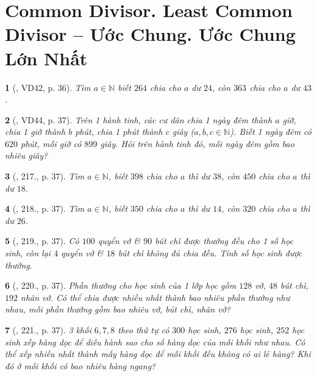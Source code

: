 \documentclass{article}
\newtheorem{baitoan}{}
\begin{document}

\section{Common Divisor. Least Common Divisor -- Ước Chung. Ước Chung Lớn Nhất}

\begin{baitoan}[\cite{Binh_Toan_6_tap_1}, VD42, p. 36]
	Tìm $a\in\mathbb{N}$ biết $264$ chia cho $a$ dư $24$, còn $363$ chia cho $a$ dư $43$.
\end{baitoan}

\begin{baitoan}[\cite{Binh_Toan_6_tap_1}, VD44, p. 37]
	Trên 1 hành tinh, các cư dân chia 1 ngày đêm thành $a$ giờ, chia 1 giờ thành $b$ phút, chia 1 phút thành $c$ giây ($a,b,c\in\mathbb{N}$). Biết 1 ngày đêm có $620$ phút, mỗi giờ có $899$ giây. Hỏi trên hành tinh đó, mỗi ngày đêm gồm bao nhiêu giây?
\end{baitoan}

\begin{baitoan}[\cite{Binh_Toan_6_tap_1}, 217., p. 37]
	Tìm $a\in\mathbb{N}$, biết $398$ chia cho $a$ thì dư $38$, còn $450$ chia cho $a$ thì dư $18$.
\end{baitoan}

\begin{baitoan}[\cite{Binh_Toan_6_tap_1}, 218., p. 37]
	Tìm $a\in\mathbb{N}$, biết $350$ chia cho $a$ thì dư $14$, còn $320$ chia cho $a$ thì dư $26$.
\end{baitoan}

\begin{baitoan}[\cite{Binh_Toan_6_tap_1}, 219., p. 37]
	Có $100$ quyển vở \& $90$ bút chì được thưởng đều cho 1 số học sinh, còn lại $4$ quyển vở \& $18$ bút chì không đủ chia đều. Tính số học sinh được thưởng.
\end{baitoan}

\begin{baitoan}[\cite{Binh_Toan_6_tap_1}, 220., p. 37]
	Phần thưởng cho học sinh của 1 lớp học gồm $128$ vở, $48$ bút chì, $192$ nhãn vở. Có thể chia được nhiều nhất thành bao nhiêu phần thưởng như nhau, mỗi phần thưởng gồm bao nhiêu vở, bút chì, nhãn vở?
\end{baitoan}

\begin{baitoan}[\cite{Binh_Toan_6_tap_1}, 221., p. 37]
	3 khối $6,7,8$ theo thứ tự có $300$ học sinh, $276$ học sinh, $252$ học sinh xếp hàng dọc để diễu hành sao cho số hàng dọc của mỗi khối như nhau. Có thể xếp nhiều nhất thành mấy hàng dọc để mỗi khối đều không có ai lẻ hàng? Khi đó ở mỗi khối có bao nhiêu hàng ngang?
\end{baitoan}
\end{document}
